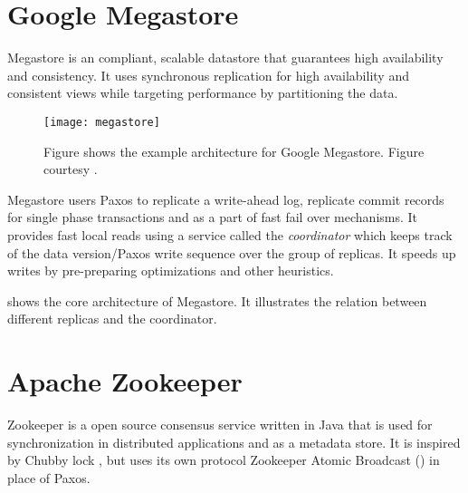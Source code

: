 \section{Google Megastore}

Megastore \citep{BakerBCFKLLLLY11} is an %
compliant, scalable datastore that guarantees high availability and
consistency. It uses synchronous replication for high availability and
consistent views while targeting performance by partitioning the data.

\begin{figure}
  \texttt{[image: megastore]}
  \caption[Google Megastore]{%
    Figure shows the example architecture for Google Megastore.
    Figure courtesy \citet{BakerBCFKLLLLY11}.}
  \label{figure:megastore}
\end{figure}

Megastore users Paxos to replicate a write-ahead log, replicate commit
records for single phase  transactions and as a part of fast fail
over
mechanisms. It provides fast local reads using a service called the
\emph{coordinator} which keeps track of the data version/Paxos write
sequence over the group of replicas. It speeds up writes by pre-preparing
optimizations and other heuristics.

 shows the core architecture of Megastore. It illustrates
the relation between different replicas and the coordinator.

\section{Apache Zookeeper}
\label{section:zookeeper}

Zookeeper \citep{Hunt:2010:ZWC:1855840.1855851, zookeeper} is a open source
consensus service written in Java that is used for synchronization in
distributed applications and as a metadata store. It is inspired by Chubby lock
, but uses its own protocol Zookeeper Atomic Broadcast
() in place of Paxos.

